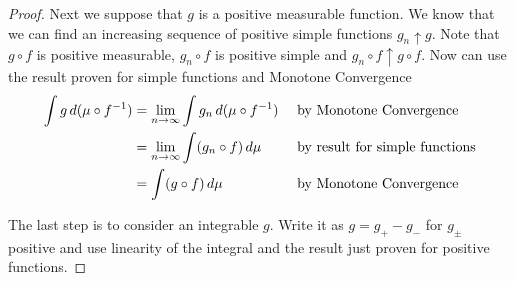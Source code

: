 \begin{proof}
Next we suppose that $g$ is a positive measurable function.  We know
that we can find an increasing sequence of positive simple functions
$g_n \uparrow g$.  Note that $g \circ f$ is positive measurable, $g_n
\circ f$ is positive simple and $g_n \circ f \uparrow g \circ f$.  Now
can use the result proven for simple functions and Monotone
Convergence 
\begin{align*}
\int g \, d(\mu \circ f^{-1}) &= \lim_{n \to \infty} \int g_n
\, d(\mu \circ f^{-1}) & &\text{ by Monotone Convergence} \\
&= \lim_{n \to \infty} \int (g_n \circ f)
\, d\mu & &\text{ by result for simple functions} \\
&=\int (g \circ f)
\, d\mu & &\text{ by Monotone Convergence} \\
\end{align*}

The last step is to consider an integrable $g$.  Write it as $g = g_+
- g_-$ for $g_\pm$ positive and use linearity of the integral and the
result just proven for positive functions.
\end{proof}

